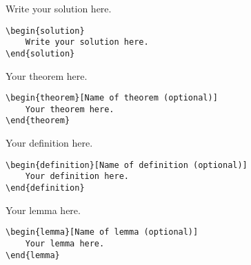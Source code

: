 \documentclass[dvipdfmx,uplatex,b5j,8pt,nomag*]{jsarticle}
\begin{document}
\begin{multicols}{2}
\begin{solution}
    Write your solution here. 
\end{solution}

\columnbreak

\begin{lstlisting}
\begin{solution}
    Write your solution here. 
\end{solution}
\end{lstlisting}
\end{multicols}

\begin{multicols}{2}
\begin{theorem}
    Your theorem here.
\end{theorem}

\columnbreak

\begin{lstlisting}
\begin{theorem}[Name of theorem (optional)]
    Your theorem here.
\end{theorem}
\end{lstlisting}
    
\end{multicols}


\begin{multicols}{2}
\begin{definition}
    Your definition here.
\end{definition}

\columnbreak

\begin{lstlisting}
\begin{definition}[Name of definition (optional)]
    Your definition here.
\end{definition}
\end{lstlisting}

\end{multicols}

\begin{multicols}{2}
\begin{lemma}
    Your lemma here.
\end{lemma}

\columnbreak

\begin{lstlisting}
\begin{lemma}[Name of lemma (optional)]
    Your lemma here.
\end{lemma}
\end{lstlisting}
    
\end{multicols}
\end{document}
